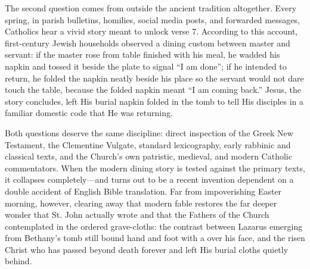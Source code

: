 The second question comes from outside the ancient tradition altogether. Every spring, in parish bulletins, homilies, social media posts, and forwarded messages, Catholics hear a vivid story meant to unlock verse 7. According to this account, first-century Jewish households observed a dining custom between master and servant: if the master rose from table finished with his meal, he wadded his napkin and tossed it beside the plate to signal ``I am done''; if he intended to return, he folded the napkin neatly beside his place so the servant would not dare touch the table, because the folded napkin meant ``I am coming back.'' Jesus, the story concludes, left His burial napkin folded in the tomb to tell His disciples in a familiar domestic code that He was returning.

Both questions deserve the same discipline: direct inspection of the Greek New Testament, the Clementine Vulgate, standard lexicography, early rabbinic and classical texts, and the Church's own patristic, medieval, and modern Catholic commentators. When the modern dining story is tested against the primary texts, it collapses completely---and turns out to be a recent invention dependent on a double accident of English Bible translation. Far from impoverishing Easter morning, however, clearing away that modern fable restores the far deeper wonder that St. John actually wrote and that the Fathers of the Church contemplated in the ordered grave-cloths: the contrast between Lazarus emerging from Bethany's tomb still bound hand and foot with a  over his face, and the risen Christ who has passed beyond death forever and left His burial cloths quietly behind.
